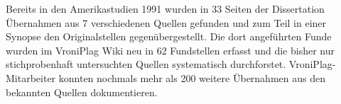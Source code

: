 \documentclass[ngerman,final,fontsize=12pt,paper=a4,twoside,bibliography=totoc,BCOR=8mm,draft=false]{scrartcl}
\begin{document}
Bereits in den Amerikastudien 1991 wurden in 33 Seiten der Dissertation Übernahmen aus 7 verschiedenen Quellen gefunden und zum Teil in einer Synopse den Originalstellen gegenübergestellt. Die dort angeführten Funde wurden im VroniPlag Wiki neu in 62 Fundstellen erfasst und die bisher nur stichprobenhaft untersuchten Quellen systematisch durchforstet. VroniPlag-Mitarbeiter konnten nochmals mehr als 200 weitere Übernahmen aus den bekannten Quellen dokumentieren. 

\end{document}
